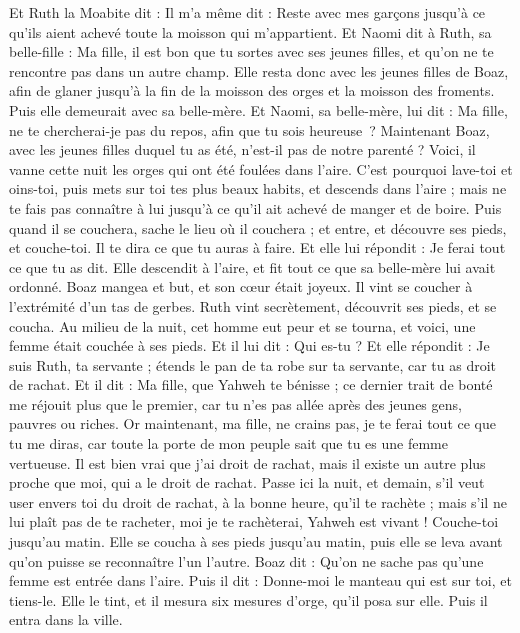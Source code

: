 \begin{multicols}{2}
Et Ruth la Moabite dit : Il m'a même dit : Reste avec mes garçons jusqu'à ce qu'ils aient achevé toute la moisson qui m'appartient.
Et Naomi dit à Ruth, sa belle-fille : Ma fille, il est bon que tu sortes avec ses jeunes filles, et qu'on ne te rencontre pas dans un autre champ.
Elle resta donc avec les jeunes filles de Boaz, afin de glaner jusqu'à la fin de la moisson des orges et la moisson des froments. Puis elle demeurait avec sa belle-mère.
\VerseOne{}Et Naomi, sa belle-mère, lui dit : Ma fille, ne te chercherai-je pas du repos, afin que tu sois heureuse ?
Maintenant Boaz, avec les jeunes filles duquel tu as été, n'est-il pas de notre parenté ? Voici, il vanne cette nuit les orges qui ont été foulées dans l'aire.
C'est pourquoi lave-toi et oins-toi, puis mets sur toi tes plus beaux habits, et descends dans l'aire ; mais ne te fais pas connaître à lui jusqu'à ce qu'il ait achevé de manger et de boire.
Puis quand il se couchera, sache le lieu où il couchera ; et entre, et découvre ses pieds, et couche-toi. Il te dira ce que tu auras à faire.
Et elle lui répondit : Je ferai tout ce que tu as dit.
Elle descendit à l'aire, et fit tout ce que sa belle-mère lui avait ordonné.
Boaz mangea et but, et son cœur était joyeux. Il vint se coucher à l'extrémité d'un tas de gerbes. Ruth vint secrètement, découvrit ses pieds, et se coucha.
Au milieu de la nuit, cet homme eut peur et se tourna, et voici, une femme était couchée à ses pieds.
Et il lui dit : Qui es-tu ? Et elle répondit : Je suis Ruth, ta servante ; étends le pan de ta robe sur ta servante, car tu as droit de rachat.
Et il dit : Ma fille, que Yahweh te bénisse ; ce dernier trait de bonté me réjouit plus que le premier, car tu n'es pas allée après des jeunes gens, pauvres ou riches.
Or maintenant, ma fille, ne crains pas, je te ferai tout ce que tu me diras, car toute la porte de mon peuple sait que tu es une femme vertueuse.
Il est bien vrai que j'ai droit de rachat, mais il existe un autre plus proche que moi, qui a le droit de rachat.
Passe ici la nuit, et demain, s'il veut user envers toi du droit de rachat, à la bonne heure, qu'il te rachète ; mais s'il ne lui plaît pas de te racheter, moi je te rachèterai, Yahweh est vivant ! Couche-toi jusqu'au matin.
Elle se coucha à ses pieds jusqu'au matin, puis elle se leva avant qu'on puisse se reconnaître l'un l'autre. Boaz dit : Qu'on ne sache pas qu'une femme est entrée dans l'aire.
Puis il dit : Donne-moi le manteau qui est sur toi, et tiens-le. Elle le tint, et il mesura six mesures d'orge, qu'il posa sur elle. Puis il entra dans la ville.

\end{multicols}
